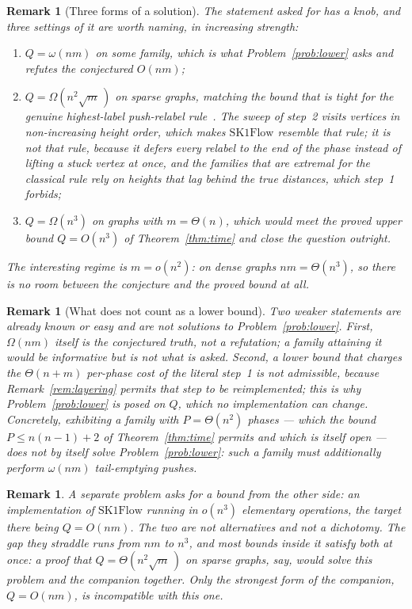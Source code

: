 \documentclass[10pt]{article}
\newtheorem{remark}[theorem]{Remark}
\newcommand{\SKF}{\text{SK1Flow}}
\begin{document}
\begin{remark}[Three forms of a solution]\label{rem:strength}
The statement asked for has a knob, and three settings of it are worth naming,
in increasing strength:
\begin{enumerate}
  \item $Q=\omega(nm)$ on some family, which is what
  Problem~\ref{prob:lower} asks and refutes the conjectured $O(nm)$;
  \item $Q=\Omega(n^{2}\sqrt m\,)$ on sparse graphs, matching the bound that is
  tight for the genuine highest-label push-relabel
  rule~\cite{CheriyanMaheshwari89,CheriyanMehlhorn99}. The sweep of step~2
  visits vertices in non-increasing height order, which makes $\SKF$ resemble
  that rule; it is not that rule, because it defers every relabel to the end of
  the phase instead of lifting a stuck vertex at once, and the families that are
  extremal for the classical rule rely on heights that lag behind the true
  distances, which step~1 forbids;
  \item $Q=\Omega(n^{3})$ on graphs with $m=\Theta(n)$, which would meet the
  proved upper bound $Q=O(n^{3})$ of Theorem~\ref{thm:time} and close the
  question outright.
\end{enumerate}
The interesting regime is $m=o(n^{2})$: on dense graphs $nm=\Theta(n^{3})$, so
there is no room between the conjecture and the proved bound at all.
\end{remark}

\begin{remark}[What does not count as a lower bound]\label{rem:notlower}
Two weaker statements are already known or easy and are not solutions to
Problem~\ref{prob:lower}. First, $\Omega(nm)$ itself is the conjectured truth,
not a refutation; a family attaining it would be informative but is not what is
asked. Second, a lower bound that charges the $\Theta(n+m)$ per-phase cost of
the literal step~1 is not admissible, because Remark~\ref{rem:layering} permits
that step to be reimplemented; this is why Problem~\ref{prob:lower} is posed on
$Q$, which no implementation can change. Concretely, exhibiting a family with
$P=\Theta(n^{2})$ phases --- which the bound $P\le n(n-1)+2$ of
Theorem~\ref{thm:time} permits and which is itself open --- does \emph{not} by
itself solve Problem~\ref{prob:lower}: such a
family must additionally perform $\omega(nm)$ tail-emptying pushes.
\end{remark}

\begin{remark}\label{rem:dichotomy}
A separate problem asks for a bound from the
other side: an implementation of $\SKF$ running in $o(n^{3})$ elementary
operations, the target there being $Q=O(nm)$. The two are not alternatives and
not a dichotomy. The gap they straddle runs from $nm$ to $n^{3}$, and most
bounds inside it satisfy both at once: a proof that $Q=\Theta(n^{2}\sqrt m\,)$ on
sparse graphs, say, would solve this problem and the companion together. Only
the strongest form of the companion, $Q=O(nm)$, is incompatible with this one.
\end{remark}
\end{document}
